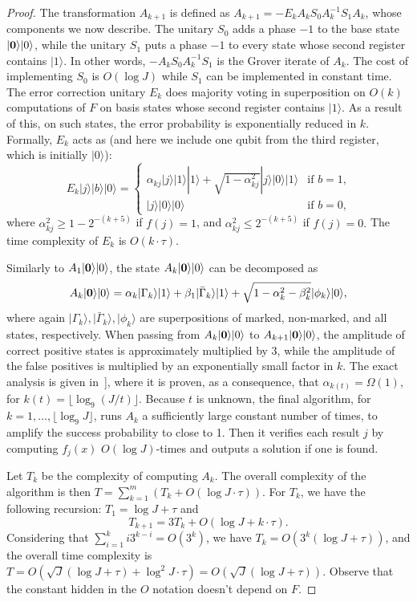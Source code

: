 \documentclass[12pt]{article}
\newcommand{\floor}[1]{\lfloor #1 \rfloor}
\newcommand{\ket}[1]{|#1\rangle}
\theoremstyle{definition}
\begin{document}
\begin{proof}
The transformation $A_{k+1}$ is defined as $A_{k+1} = - E_k A_k S_0 A_k^{-1} S_1 A_k$, whose components we now describe.
The unitary $S_0$ adds a phase $-1$ to the base state $\ket{{\bf 0}} \ket{0}$, while the unitary $S_1$ puts a phase $-1$ to every state whose second register contains $\ket{1}$. 
In other words, $-A_k S_0 A_k^{-1} S_1$ is the Grover iterate of $A_k$.
The cost of implementing $S_0$ is $O(\log J)$ while $S_1$ can be implemented in constant time. The error correction unitary $E_k$ does majority voting in superposition on $O(k)$ computations of $F$ on basis states whose second register contains $\ket{1}$. As a result of this, on such states, the error probability is exponentially reduced in $k$.
Formally, $E_k$ acts as (and here we include one qubit from the third register, which is initially $\ket{0}$):
\[
E_k \ket{j} \ket{b} \ket{0} = 
\begin{cases}
\alpha_{kj} \ket{j} \ket{1} \ket{1} + \sqrt{1 - \alpha_{kj}^2} \ket{j} \ket{0} \ket{1}  & \text{if $b=1$,} \\
\ket{j} \ket{0} \ket{0} & \text{if $b=0$,}
\end{cases}
\]
where $\alpha_{kj}^2 \geq 1 - 2^{-(k+5)}$ if $f(j) = 1$, and $\alpha_{kj}^2 \leq 2^{-(k+5)}$ if $f(j) = 0.$
The time complexity of $E_k$ is $O(k \cdot \tau).$

Similarly to $A_1 \ket{{\bf 0}} \ket{0}$, the state $A_k \ket{{\bf 0}} \ket{0}$ can be decomposed as
$$
A_k \ket{{\bf 0}} \ket{0} = \alpha_k \ket{\Gamma_k}\ket{1} + \beta_1 \ket{\bar{\Gamma}_k}\ket{1} + 
\sqrt{ 1 - \alpha_k^2 - \beta_k^2 }  \ket{\phi_k}   \ket{0},
$$
where again $\ket{\Gamma_k}, \ket{\bar{\Gamma}_k},  \ket{\phi_k} $ are superpositions of marked, non-marked, and all states, respectively. When passing from $A_k \ket{{\bf 0}} \ket{0} $ to $A_{k+1} \ket{{\bf 0}} \ket{0} $, the amplitude of correct positive states is approximately multiplied by $3$, while the amplitude of the false positives is multiplied by an exponentially small factor in $k$. The exact analysis is given in~\cite{hoyer2003quantum}], where it is proven, as a consequence, that $\alpha_{k(t)} = \Omega(1)$, for $k(t) = \floor{\log_9 (J/t)}$. 
Because $t$ is unknown, the final algorithm, for $k = 1, \ldots, \floor{ \log_9 J}$, runs $A_k$ a sufficiently large constant number of times, to amplify the success probability to close to 1.
Then it verifies each result $j$ by computing $f_j(x)$ $O(\log J)$-times and outputs a solution if one is found.

Let $T_k$ be the complexity of computing $A_k$. The overall complexity of the algorithm is then 
$T = \sum_{k=1}^m (T_k + O( \log J \cdot \tau)).$
For $T_k$, we have the following recursion: $T_1 = \log J + \tau$ and
$$
T_{k+1} = 3 T_k + O( \log J + k \cdot \tau).
$$
Considering that $ \sum_{i=1}^{k} i 3^{k-i} = O(3^k)$, we have $T_k =  {O}(3^k ( \log J + \tau))$, and the overall time complexity is 
$T = O(\sqrt{J} (\log J + \tau) + \log^2 J \cdot \tau) = O(\sqrt{J} (\log J + \tau))$.
Observe that the constant hidden in the $O$ notation doesn't depend on $F$.
\end{proof}
\end{document}
